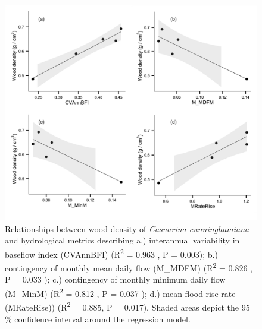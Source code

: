 \clearpage


\begin{figure}[ht]
\begin{center}
\includegraphics[width=\textwidth,keepaspectratio=true]{Ch2figS1.png} %
\caption[Relationships between wood density of \textit{Casuarina cunninghamiana} and hydrological metrics]{\small{Relationships between wood density of \textit{Casuarina cunninghamiana} and hydrological metrics describing a.) interannual variability in baseflow index (CVAnnBFI) (R\textsuperscript{2} = 0.963 , P = 0.003); b.) contingency of monthly mean daily flow (M\_MDFM) (R\textsuperscript{2} = 0.826 , P = 0.033 ); c.) contingency of monthly minimum daily flow (M\_MinM) (R\textsuperscript{2} = 0.812 , P = 0.037 );  d.) mean flood rise rate (MRateRise)) (R\textsuperscript{2} = 0.885, P = 0.017). Shaded areas depict the 95 \% confidence interval around the regression model.}}
\label{Ch2sup_F1} %
\end{center}
\end{figure}   
\clearpage
